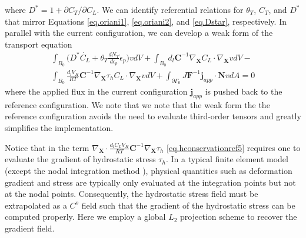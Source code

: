 \documentclass[10pt]{elsarticle}
\newcommand{\mbs}[1]{\boldsymbol{#1}}
\def\bs{{\mbs{s}}} \def\bt{{\mbs{t}}} \def\bu{{\mbs{u}}}
\def\bs{\boldsymbol}
\begin{document}
where $D^{*} = 1 + \partial C_{T}/ \partial C_{L}$. We can identify referential relations for $\theta_{T}$, $C_{T}$, and $D^{*}$  that mirror Equations \ref{eq.oriani1}, \ref{eq.oriani2}, and \ref{eq.Dstar}, respectively. In parallel with the current configuration, we can develop a weak form of the transport equation
%
\begin{align}
\label{eq.hconservationref5} \int_{B_{0}} \bigg( D^{*}\dot{C_{L}} +  \theta_{T} \frac{d N_{T}}{d \epsilon_{p}} \dot{\epsilon}_{p} \bigg)vdV  + \int_{B_{0}}  d_{l} \bs{C}^{-1}  \nabla_{\bs{X}} C_{L}  \cdot  \nabla_{\bs{X}}v dV - \nonumber \\ \int_{B_{0}}  \frac{d_{l} V_{H}}{RT} \bs{C}^{-1} \nabla_{\bs{X}} \tau_{h}C_{L}  \cdot \nabla_{\bs{X}}v dV + \int_{\partial \Gamma_{0}} J\bs{F}^{-1}\bs{j}_{app} \cdot \bs{N}vdA = 0
\end{align}
%
where the applied flux in the current configuration $\bs{j}_{app}$ is pushed back to the reference configuration. We note that we note that the weak form the the reference configuration avoids the need to evaluate third-order tensors and greatly simplifies the implementation. 
%
%
%
%
%
%

Notice that in the term 
$\nabla_{\bs{X}}  \cdot \frac{d_{l} C_{L}V_{H}}{RT} \bs{C}^{-1} \nabla_{\bs{X}}\tau_{h}$ \eqref{eq.hconservationref5}
requires one to evaluate the gradient of hydrostatic stress $\tau_{h}$. In a typical finite element model
(except the nodal integration method \cite{Krysl:2008}), physical quantities such as deformation gradient
 and stress are typically only evaluated at the integration points but not at the nodal points. 
 Consequently, the hydrostatic stress field must be extrapolated as a $C^{o}$ field  such that the gradient of the hydrostatic
 stress can be computed properly. Here we employ a global $L_{2}$ projection scheme to recover the gradient field. 
 
\end{document}
